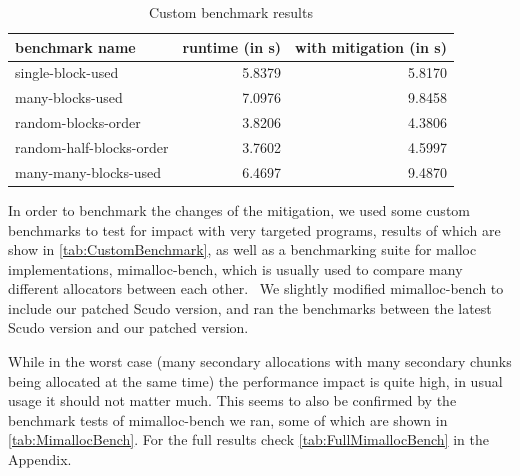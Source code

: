 \documentclass[a4paper,11pt,oneside]{report}
\begin{document}
\begin{longtable}[h]{l r r}
  \caption{Custom benchmark results}\label{tab:CustomBenchmark} \\
  
  \toprule
  benchmark name           & runtime (in s) & with mitigation (in s) \\
  \midrule
  \endhead{}
  single-block-used        & 5.8379         & 5.8170                 \\
  \midrule
  many-blocks-used         & 7.0976         & 9.8458                 \\
  \midrule
  random-blocks-order      & 3.8206         & 4.3806                 \\
  \midrule
  random-half-blocks-order & 3.7602         & 4.5997                 \\
  \midrule
  many-many-blocks-used    & 6.4697         & 9.4870                 \\
  \bottomrule
\end{longtable}

In order to benchmark the changes of the mitigation, we used some custom benchmarks to
test for impact with very targeted programs, results of which are show in
\autoref{tab:CustomBenchmark}, as well as a benchmarking suite for malloc implementations,
mimalloc-bench, which is usually used to compare many different allocators between each
other.~\cite{mimalloc-bench} We slightly modified mimalloc-bench to include our patched
Scudo version, and ran the benchmarks between the latest Scudo version and our patched
version.

While in the worst case (many secondary allocations with many secondary chunks being
allocated at the same time) the performance impact is quite high, in usual usage it should
not matter much. This seems to also be confirmed by the benchmark tests of mimalloc-bench
we ran, some of which are shown in \autoref{tab:MimallocBench}. For the full results check
\autoref{tab:FullMimallocBench} in the Appendix.
\end{document}
